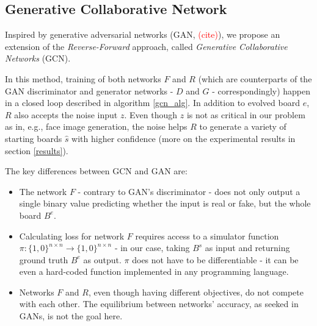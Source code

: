 \documentclass[conference]{IEEEtran}
\newcommand\todo[1]{\textcolor{red}{#1}}
\begin{document}
\subsection{Generative Collaborative Network}
\label{gcn}
Inspired by generative adversarial networks (GAN, \todo{(cite)}), we propose an extension of the \emph{Reverse-Forward} approach, called \emph{Generative Collaborative Networks} (GCN).


In this method, training of both networks $F$ and $R$ (which are counterparts of the GAN discriminator and generator networks - $D$ and $G$ - correspondingly) happen in a closed loop described in algorithm \ref{gcn_alg}. In addition to evolved board $e$, $R$ also accepts the noise input $z$. Even though $z$ is not as critical in our problem as in, e.g., face image generation, the noise helps $R$ to generate a variety of starting boards $\hat s$ with higher confidence (more on the experimental results in section \ref{results}). 

The key differences between GCN and GAN are:
\begin{itemize}
    \item The network $F$ - contrary to GAN's discriminator - does not only output a single binary value predicting whether the input is real or fake, but the whole board $B^e$.
    \item Calculating loss for network $F$ requires access to a simulator function $\pi : \{1,0\}^{n\times n} \rightarrow \{1,0\}^{n\times n}$ - in our case, taking $B^s$ as input and returning ground truth $B^e$ as output. $\pi$ does not have to be differentiable - it can be even a hard-coded function implemented in any programming language.
    \item Networks $F$ and $R$, even though having different objectives, do not compete with each other. The equilibrium between networks' accuracy, as seeked in GANs, is not the goal here.
\end{itemize}
\end{document}
